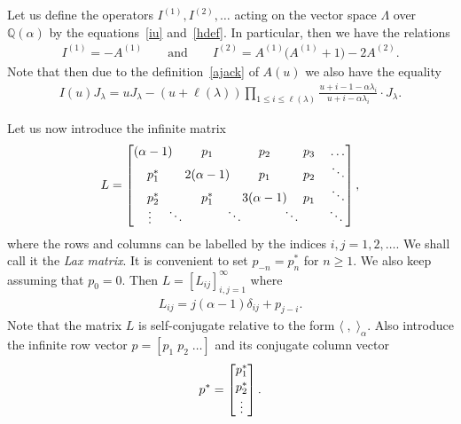 \documentclass[pdftex]{sigma}
\numberwithin{equation}{section}
\renewcommand\ge{\geqslant}
\renewcommand\le{\leqslant}
\begin{document}
Let us def\/ine the operators $I^{(1)},I^{(2)},\ldots$ acting on the vector
space $\Lambda$ over $\mathbb Q(\alpha)$ by the equations~\eqref{iu} and~\eqref{hdef}.
In particular, then we have the relations
\begin{gather*}
I^{(1)}=-A^{(1)}
\qquad
\text{and}
\qquad
I^{(2)}=A^{(1)}\big(A^{(1)}
+1\big)-2A^{(2)}.
\end{gather*}
Note that then due to the def\/inition~\eqref{ajack} of $A(u)$ we also have the equality
\begin{gather*}
I(u)J_\lambda=uJ_\lambda-(u+\ell(\lambda))\prod_{1\le i
\le\ell(\lambda)}\frac{u+i-1-\alpha\lambda_i}{u+i-\alpha\lambda_i}\cdot J_\lambda.
\end{gather*}

Let us now introduce the inf\/inite matrix
\begin{gather}
\label{Lax_matrix}
L=
\begin{bmatrix}
(\alpha-1)&p_1&p_2&p_3&\hspace{-1pt}\ldots
\\
p_1^*&2(\alpha-1)&p_1&p_2&\ddots
\\
p_2^*&p_1^*&3(\alpha-1)&p_1&\ddots
\\[-2pt]
\raisebox{-1pt}{\vdots}\hspace{12pt}\ddots\hspace{-20pt}&\hspace{24pt}\ddots\hspace{-20pt}
&\hspace{24pt}\ddots\hspace{-20pt}&\hspace{24pt}\ddots\hspace{-20pt}
\end{bmatrix},
\end{gather}
where the rows and columns can be labelled by the indices $i,j=1,2,\ldots$.
We shall call it the \emph{Lax matrix}.
It is convenient to set $p_{-n}=p^{\ast}_n$ for $n\ge1$.
We also keep assuming that $p_{0}=0$.
Then $L=[ L_{ij}]_{i,j=1}^{\infty}$ where
\begin{gather}
\label{Ljk}
L_{ij}=j(\alpha-1)\delta_{ij}+p_{j-i}.
\end{gather}
Note that the matrix $L$ is self-conjugate relative to the form $\langle\; ,\; \rangle_\alpha$.
Also introduce the inf\/inite row vector $p=[p_1\; p_2\; \ldots]$ and its conjugate column vector
\begin{gather*}
p^{\ast}=
\begin{bmatrix}
p^{\ast}_1
\\[2pt]
p^{\ast}_2
\\[6pt]
\raisebox{0pt}[0pt][2pt]{\vdots}
\end{bmatrix}
.
\end{gather*}
\end{document}
